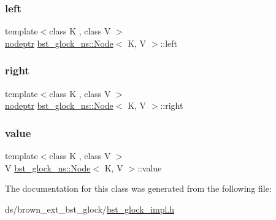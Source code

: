 \mbox{\label{classbst__glock__ns_1_1Node_ad16c7dbe2a53438d474cc37343252035}} 
\subsubsection{\texorpdfstring{left}{left}}
{\footnotesize\ttfamily template$<$class K , class V $>$ \\
\hyperlink{bst__rwlock__impl_8h_a04158d2a20768fe447133ff555823b05}{nodeptr} \hyperlink{classbst__glock__ns_1_1Node}{bst\+\_\+glock\+\_\+ns\+::\+Node}$<$ K, V $>$\+::left}

\mbox{\label{classbst__glock__ns_1_1Node_a73203abec3d0b72abbdc7815d54ca3f9}} 
\subsubsection{\texorpdfstring{right}{right}}
{\footnotesize\ttfamily template$<$class K , class V $>$ \\
\hyperlink{bst__rwlock__impl_8h_a04158d2a20768fe447133ff555823b05}{nodeptr} \hyperlink{classbst__glock__ns_1_1Node}{bst\+\_\+glock\+\_\+ns\+::\+Node}$<$ K, V $>$\+::right}

\mbox{\label{classbst__glock__ns_1_1Node_a76a7234ad2a679e2f4b02ca17cadaf62}} 
\subsubsection{\texorpdfstring{value}{value}}
{\footnotesize\ttfamily template$<$class K , class V $>$ \\
V \hyperlink{classbst__glock__ns_1_1Node}{bst\+\_\+glock\+\_\+ns\+::\+Node}$<$ K, V $>$\+::value}



The documentation for this class was generated from the following file\+:\begin{DoxyCompactItemize}
\item 
ds/brown\+\_\+ext\+\_\+bst\+\_\+glock/\hyperlink{bst__glock__impl_8h}{bst\+\_\+glock\+\_\+impl.\+h}\end{DoxyCompactItemize}
